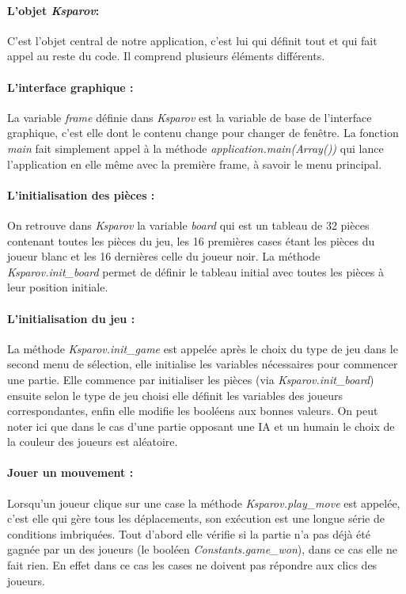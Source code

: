 \documentclass[a4paper]{article}
\begin{document}
\paragraph{L'objet \textit{Ksparov}:}C'est l'objet central de notre application, c'est lui qui définit tout et qui fait appel au reste du code. Il comprend plusieurs éléments différents. 

\paragraph{L'interface graphique :}La variable \textit{frame} définie dans \textit{Ksparov} est la variable de base de l'interface graphique, c'est elle dont le contenu change pour changer de fenêtre. La fonction \textit{main} fait simplement appel à la méthode \textit{application.main(Array())} qui lance l'application en elle même avec la première frame, à savoir le menu principal. 

\paragraph{L'initialisation des pièces :}On retrouve dans \textit{Ksparov} la variable \textit{board} qui est un tableau de 32 pièces contenant toutes les pièces du jeu, les 16 premières cases étant les pièces du joueur blanc et les 16 dernières celle du joueur noir. La méthode \textit{Ksparov.init\_board} permet de définir le tableau initial avec toutes les pièces à leur position initiale.

\paragraph{L'initialisation du jeu :}La méthode \textit{Ksparov.init\_game} est appelée après le choix du type de jeu dans le second menu de sélection, elle initialise les variables nécessaires pour commencer une partie. Elle commence par initialiser les pièces (via \textit{Ksparov.init\_board}) ensuite selon le type de jeu choisi elle définit les variables des joueurs correspondantes, enfin elle modifie les booléens aux bonnes valeurs. On peut noter ici que dans le cas d'une partie opposant une IA et un humain le choix de la couleur des joueurs est aléatoire. 

\paragraph{Jouer un mouvement :}Lorsqu'un joueur clique sur une case la méthode \textit{Ksparov.play\_move} est appelée, c'est elle qui gère tous les déplacements, son exécution est une longue série de conditions imbriquées. Tout d'abord elle vérifie si la partie n'a pas déjà été gagnée par un des joueurs (le booléen \textit{Constants.game\_won}), dans ce cas elle ne fait rien. En effet dans ce cas les cases ne doivent pas répondre aux clics des joueurs. \\
\end{document}
